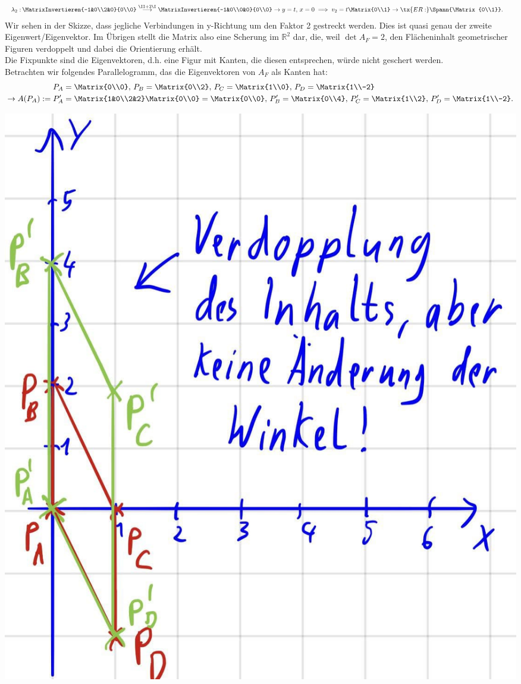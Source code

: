 \begin{Beispiel}
\begin{align*}
    \lambda_2:&\, \MatrixInvertieren{-1&0\\2&0}{0\\0}\overset{\II+2\I}{\longrightarrow}\MatrixInvertieren{-1&0\\0&0}{0\\0}\to y=t,\,x=0\implies v_2=t\Matrix{0\\1}\to\tx{ER: }\Spann{\Matrix{0\\1}}.
\end{align*}
Wir sehen in der Skizze, dass jegliche Verbindungen in y-Richtung um den Faktor 2 gestreckt werden. Dies ist quasi genau der zweite Eigenwert/Eigenvektor. Im Übrigen stellt die Matrix also eine Scherung im $\mathbb{R}^2$ dar, die, weil $\det A_F=2$, den Flächeninhalt geometrischer Figuren verdoppelt und dabei die Orientierung erhält.\\
Die Fixpunkte sind die Eigenvektoren, d.h. eine Figur mit Kanten, die diesen entsprechen, würde nicht geschert werden.\\
Betrachten wir folgendes Parallelogramm, das die Eigenvektoren von $A_F$ als Kanten hat:
\begin{align*}
    P_A&=\Matrix{0\\0},\,P_B=\Matrix{0\\2},\,P_C=\Matrix{1\\0},\,P_D=\Matrix{1\\-2}\\
    \to A(P_A):=P_A'&=\Matrix{1&0\\2&2}\Matrix{0\\0}=\Matrix{0\\0},\,P_B'=\Matrix{0\\4},\,P_C'=\Matrix{1\\2},\,P_D'=\Matrix{1\\-2}.
\end{align*}
\begin{center}
    \includegraphics[width=.25\textwidth]{Dateien/02/02Anschauung2.jpg}
\end{center}
\end{Beispiel}


